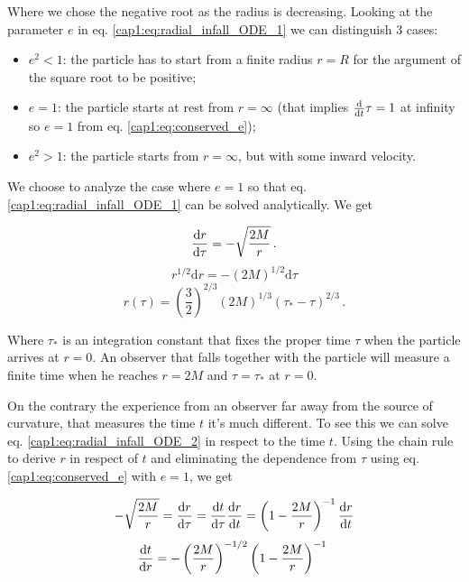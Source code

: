 Where we chose the negative root as the radius is decreasing.
Looking at the parameter $e$ in eq. \ref{cap1:eq:radial_infall_ODE_1} we can
distinguish 3 cases:

\begin{itemize}
    \item $e^2 < 1$: the particle has to start from a finite radius $r = R$
        for the argument of the square root to be positive;
    \item $e = 1$: the particle starts at rest from $r = \infty$ (that implies
        $\dv t \tau = 1$ at infinity so $e = 1$ from eq.
        \ref{cap1:eq:conserved_e});
    \item $e^2 > 1$: the particle starts from $r = \infty$, but with some
        inward velocity.
\end{itemize}

We choose to analyze the case where $e = 1$ so that eq.
\ref{cap1:eq:radial_infall_ODE_1} can be solved analytically.
We get

\begin{equation}
    \dv{r}{\tau} = - \sqrt{\frac{2 M}{r}} \, .
    \label{cap1:eq:radial_infall_ODE_2}
\end{equation}
\begin{equation*}
    r^{1/2} \mathrm{d}r = -(2M)^{1/2} \mathrm{d}\tau
\end{equation*}
\begin{equation}
    r(\tau) = \left(\frac{3}{2}\right)^{2/3}
    (2M)^{1/3} (\tau_* - \tau)^{2/3} \, .
    \label{cap1:eq:radial_infall_r_of_tau}
\end{equation}

Where $\tau_*$ is an integration constant that fixes the proper time $\tau$
when the particle arrives at $r = 0$.
An observer that falls together with the particle will measure a finite time
when he reaches $r = 2M$ and $\tau = \tau_*$ at $r = 0$.

On the contrary the experience from an observer far away from the source of
curvature, that measures the \Sh time $t$ it's much different.
To see this we can solve eq. \ref{cap1:eq:radial_infall_ODE_2} in respect to
the \Sh time $t$.
Using the chain rule to derive $r$ in respect of $t$ and eliminating the
dependence from $\tau$ using eq. \ref{cap1:eq:conserved_e} with $e = 1$, we get

\begin{align*}
    - \sqrt{\frac{2 M}{r}} = \dv{r}{\tau} = \dv{t}{\tau} \dv{r}{t}
    = \left(1 - \frac{2M}{r} \right)^{-1} \dv{r}{t}
\end{align*}
\begin{equation*}
    \dv{t}{r} = - \left(\frac{2 M}{r}\right)^{-1/2}
    \left(1 - \frac{2M}{r} \right)^{-1} \,  \, 
\end{equation*}

